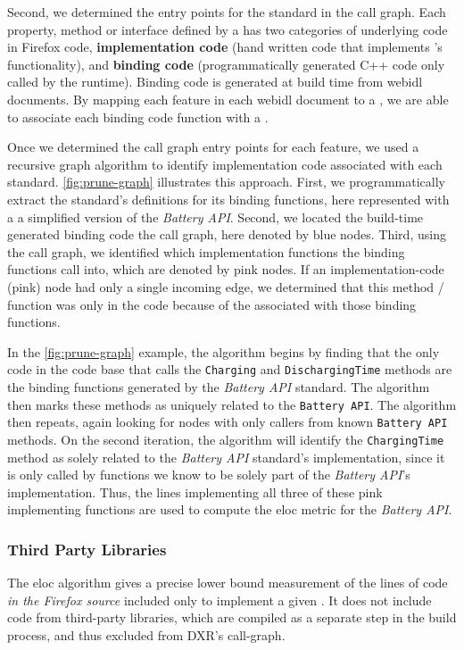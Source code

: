 Second, we determined the entry points for the standard in the call
graph.  Each property, method or interface defined by a \WAS has two categories
of underlying code in Firefox code, \textbf{implementation code}
(hand written code that implements \WAS's functionality), and \textbf{binding
code} (programmatically generated C++ code only called by the \JS runtime).
Binding code is generated at build time from \gls{webidl} documents. By
mapping each feature in each \gls{webidl} document to a \WAS, we are able to
associate each binding code function with a \WAS.



Once we determined the call graph entry points for each \WAPI feature, we used
a recursive graph algorithm to identify implementation code associated with
each standard.  \ref{fig:prune-graph} illustrates this approach.  First, we
programmatically extract the standard's definitions for its binding functions,
here represented with a a simplified version of the \textit{Battery API}. Second,
we located the build-time generated binding code the \FF call graph, here
denoted by blue nodes.  Third, using the call graph, we identified which
implementation functions the binding functions call into, which are denoted by
pink nodes.  If an implementation-code (pink) node had only a single incoming edge,
we determined that this method / function was only in the code because of
the \WAS associated with those binding functions.

In the \ref{fig:prune-graph} example, the algorithm begins by finding that the
only code in the \FF code base that calls the \texttt{Charging} and
\texttt{DischargingTime} methods are the binding functions generated by the
\textit{Battery API} standard.  The algorithm then marks these methods as
uniquely related to the \texttt{Battery API}.  The algorithm then repeats,
again looking for nodes with only callers from known \texttt{Battery API}
methods.  On the second iteration, the algorithm will identify the
\texttt{ChargingTime} method as solely related to the \textit{Battery API}
standard's implementation, since it is only called by functions we know to be
solely part of the \textit{Battery API}'s implementation. Thus, the lines
implementing all three of these pink implementing functions are used to compute
the \gls{eloc} metric for the \textit{Battery API}.


\subsubsection{Third Party Libraries}
\label{cost-benefit:methodology:third-party-libraries}
The \gls{eloc} algorithm gives a precise lower bound measurement of the
lines of code \emph{in the Firefox source} included only to implement a given
\WAS.  It does not include code from third-party libraries, which are compiled
as a separate step in the \FF build process, and thus excluded from DXR's
call-graph.

